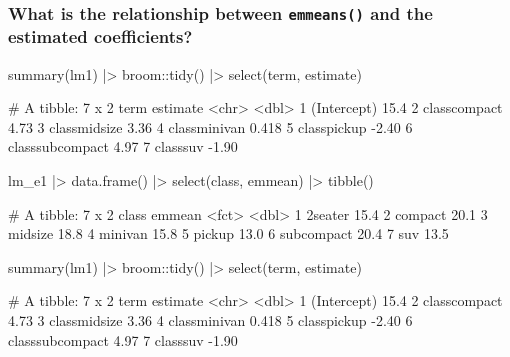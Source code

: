 \documentclass[a4paper]{article}
\begin{document}
\subsubsection{What is the relationship between \lstinline|emmeans()| and the estimated coefficients?}
\begin{minipage}[t]{0.49\textwidth}
\begin{Schunk}
\begin{Sinput}
summary(lm1) |> 
  broom::tidy() |> 
  select(term, estimate)
\end{Sinput}
\begin{Soutput}
# A tibble: 7 x 2
  term            estimate
  <chr>              <dbl>
1 (Intercept)       15.4  
2 classcompact       4.73 
3 classmidsize       3.36 
4 classminivan       0.418
5 classpickup       -2.40 
6 classsubcompact    4.97 
7 classsuv          -1.90 
\end{Soutput}
\end{Schunk}
\end{minipage}
\hspace{0.02\textwidth}
\begin{minipage}[t]{0.49\textwidth}
\begin{Schunk}
\begin{Sinput}
lm_e1 |> data.frame() |> 
  select(class, emmean) |>
  tibble()
\end{Sinput}
\begin{Soutput}
# A tibble: 7 x 2
  class      emmean
  <fct>       <dbl>
1 2seater      15.4
2 compact      20.1
3 midsize      18.8
4 minivan      15.8
5 pickup       13.0
6 subcompact   20.4
7 suv          13.5
\end{Soutput}
\end{Schunk}
\end{minipage}
\begin{minipage}[t]{0.49\textwidth}
\begin{Schunk}
\begin{Sinput}
summary(lm1) |> 
  broom::tidy() |> 
  select(term, estimate)
\end{Sinput}
\begin{Soutput}
# A tibble: 7 x 2
  term            estimate
  <chr>              <dbl>
1 (Intercept)       15.4  
2 classcompact       4.73 
3 classmidsize       3.36 
4 classminivan       0.418
5 classpickup       -2.40 
6 classsubcompact    4.97 
7 classsuv          -1.90 
\end{Soutput}
\end{Schunk}
\end{minipage}
\end{document}
